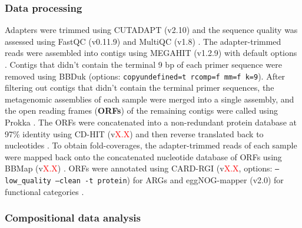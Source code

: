 \subsubsection{Data processing}

Adapters were trimmed using CUTADAPT (v2.10) and the sequence quality was assessed using FastQC (v0.11.9) and MultiQC (v1.8) \parencite{martinCutadaptRemovesAdapter2011, andrewsFastQCQualityControl2010, ewelsMultiQCSummarizeAnalysis2016}.
The adapter-trimmed reads were assembled into contigs using MEGAHIT (v1.2.9) with default options \parencite{liMEGAHITUltrafastSinglenode2015}.
Contigs that didn't contain the terminal 9 bp of each primer sequence were removed using BBDuk (options: \texttt{copyundefined=t rcomp=f mm=f k=9}).
After filtering out contigs that didn't contain the terminal primer sequences, the metagenomic assemblies of each sample were merged into a single assembly, and the open reading frames (\textbf{ORFs}) of the remaining contigs were called using Prokka \parencite{bushnellBBMap2020, seemannProkkaRapidProkaryotic2014}.
The ORFs were concatenated into a non-redundant protein database at 97\% identity using CD-HIT (v\textcolor{red}{X.X}) and then reverse translated back to nucleotides \parencite{fuCDHITAcceleratedClustering2012}.
To obtain fold-coverages, the adapter-trimmed reads of each sample were mapped back onto the concatenated nucleotide database of ORFs using BBMap (v\textcolor{red}{X.X}) \parencite{bushnellBBMap2020}.
ORFs were annotated using CARD-RGI (v\textcolor{red}{X.X}, options: \texttt{--low\_quality --clean -t protein}) for ARGs and eggNOG-mapper (v2.0) for functional categories \parencite{alcockCARD2020Antibiotic2019, huerta-cepasFastGenomewideFunctional2017, huerta-cepasEggNOGHierarchicalFunctionally2019}.

\subsubsection{Compositional data analysis}
